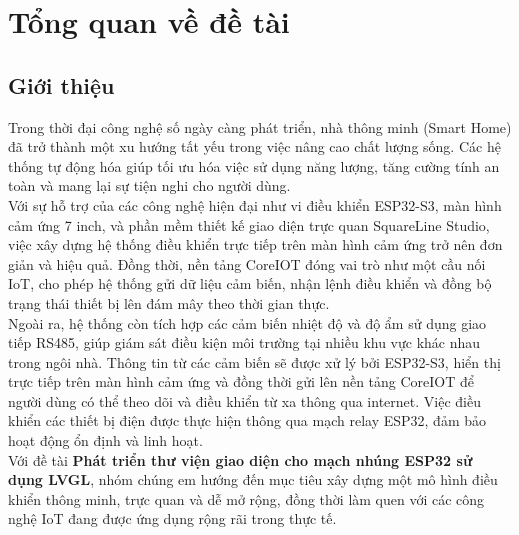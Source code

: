 \chapter{Tổng quan về đề tài}
\section{Giới thiệu}
\tab Trong thời đại công nghệ số ngày càng phát triển, nhà thông minh (Smart Home) đã trở thành một xu hướng tất yếu trong việc nâng cao chất lượng sống. Các hệ thống tự động hóa giúp tối ưu hóa việc sử dụng năng lượng, tăng cường tính an toàn và mang lại sự tiện nghi cho người dùng.\\
\tab Với sự hỗ trợ của các công nghệ hiện đại như vi điều khiển ESP32-S3, màn hình cảm ứng 7 inch, và phần mềm thiết kế giao diện trực quan SquareLine Studio, việc xây dựng hệ thống điều khiển trực tiếp trên màn hình cảm ứng trở nên đơn giản và hiệu quả. Đồng thời, nền tảng CoreIOT đóng vai trò như một cầu nối IoT, cho phép hệ thống gửi dữ liệu cảm biến, nhận lệnh điều khiển và đồng bộ trạng thái thiết bị lên đám mây theo thời gian thực.\\
\tab Ngoài ra, hệ thống còn tích hợp các cảm biến nhiệt độ và độ ẩm sử dụng giao tiếp RS485, giúp giám sát điều kiện môi trường tại nhiều khu vực khác nhau trong ngôi nhà. Thông tin từ các cảm biến sẽ được xử lý bởi ESP32-S3, hiển thị trực tiếp trên màn hình cảm ứng và đồng thời gửi lên nền tảng CoreIOT để người dùng có thể theo dõi và điều khiển từ xa thông qua internet. Việc điều khiển các thiết bị điện được thực hiện thông qua mạch relay ESP32, đảm bảo hoạt động ổn định và linh hoạt.\\
\tab Với đề tài \textbf{Phát triển thư viện giao diện cho mạch nhúng ESP32 sử dụng LVGL}, nhóm chúng em hướng đến mục tiêu xây dựng một mô hình điều khiển thông minh, trực quan và dễ mở rộng, đồng thời làm quen với các công nghệ IoT đang được ứng dụng rộng rãi trong thực tế.
